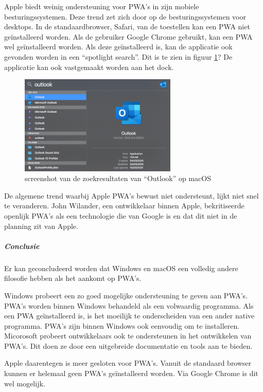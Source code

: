		
		Apple biedt weinig ondersteuning voor PWA's in zijn mobiele besturingssystemen. Deze trend zet zich door op de besturingssystemen voor desktops. In de standaardbrowser, Safari, van de toestellen kan een PWA niet geïnstalleerd worden. Als de gebruiker Google Chrome gebruikt, kan een PWA wel geïnstalleerd worden. Als deze geïnstalleerd is, kan de applicatie ook gevonden worden in een “spotlight search”. Dit is te zien in figuur \ref{fig:screenSearchmac}? De applicatie kan ook vastgemaakt worden aan het dock.
		
		\begin{figure}[H]
			\centering
			\includegraphics[width=75mm]{./img/Outlook_search_mac.png}
			\caption{screenshot van de zoekresultaten van “Outlook” op macOS}
			\label{fig:screenSearchmac}
		\end{figure}
		
		De algemene trend waarbij Apple PWA's bewust niet ondersteunt, lijkt niet snel te veranderen. John Wilander, een ontwikkelaar binnen Apple, bekritiseerde openlijk PWA's als een technologie die van Google is en dat dit niet in de planning zit van Apple. 
		\autocite{Wilander2019}
		
		
		\subparagraph{Conclusie}
		Er kan geconcludeerd worden dat Windows en macOS een volledig andere filosofie hebben als het aankomt op PWA's. 
		
		Windows probeert een zo goed mogelijke ondersteuning te geven aan PWA's. PWA's worden binnen Windows behandeld als een volwaardig programma. Als een PWA geïnstalleerd is, is het moeilijk te onderscheiden van een ander native programma.
		PWA's zijn binnen Windows ook eenvoudig om te installeren.
		Micorosoft probeert ontwikkelaars ook te ondersteunen in het ontwikkelen van PWA's. Dit doen ze door een uitgebreide documentatie en tools aan te bieden.
		
		Apple daarentegen is meer gesloten voor PWA's. Vanuit de standaard browser kunnen er helemaal geen PWA's geïnstalleerd worden. Via Google Chrome is dit wel mogelijk.
		